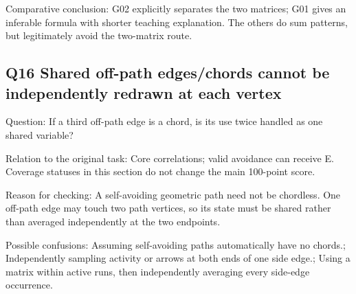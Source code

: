 \documentclass[11pt,a4paper]{article}
\begin{document}
Comparative conclusion: G02 explicitly separates the two matrices; G01 gives an inferable formula with shorter teaching explanation. The others do sum patterns,\allowbreak{} but legitimately avoid the two-matrix route.

\clearpage
\subsection{Q16 Shared off-path edges/\allowbreak{}chords cannot be independently redrawn at each vertex}
\label{aspect:Q16}
Question: If a third off-path edge is a chord,\allowbreak{} is its use twice handled as one shared variable?

Relation to the original task: Core correlations; valid avoidance can receive E. Coverage statuses in this section do not change the main 100-point score.

Reason for checking: A self-avoiding geometric path need not be chordless. One off-path edge may touch two path vertices,\allowbreak{} so its state must be shared rather than averaged independently at the two endpoints.

Possible confusions: Assuming self-avoiding paths automatically have no chords.; Independently sampling activity or arrows at both ends of one side edge.; Using a matrix within active runs,\allowbreak{} then independently averaging every side-edge occurrence.
\end{document}
